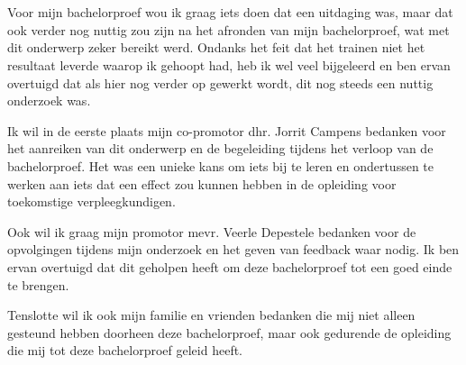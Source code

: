 
\chapter*{}%
\label{ch:voorwoord}


Voor mijn bachelorproef wou ik graag iets doen dat een uitdaging was, maar dat ook verder nog nuttig zou zijn na het afronden van mijn bachelorproef, wat met dit onderwerp zeker bereikt werd. Ondanks het feit dat het trainen niet het resultaat leverde waarop ik gehoopt had, heb ik wel veel bijgeleerd en ben ervan overtuigd dat als hier nog verder op gewerkt wordt, dit nog steeds een nuttig onderzoek was.

Ik wil in de eerste plaats mijn co-promotor dhr. Jorrit Campens bedanken voor het aanreiken van dit onderwerp en de begeleiding tijdens het verloop van de bachelorproef. Het was een unieke kans om iets bij te leren en ondertussen te werken aan iets dat een effect zou kunnen hebben in de opleiding voor toekomstige verpleegkundigen.

Ook wil ik graag mijn promotor mevr. Veerle Depestele bedanken voor de opvolgingen tijdens mijn onderzoek en het geven van feedback waar nodig. Ik ben ervan overtuigd dat dit geholpen heeft om deze bachelorproef tot een goed einde te brengen.

Tenslotte wil ik ook mijn familie en vrienden bedanken die mij niet alleen gesteund hebben doorheen deze bachelorproef, maar ook gedurende de opleiding die mij tot deze bachelorproef geleid heeft.